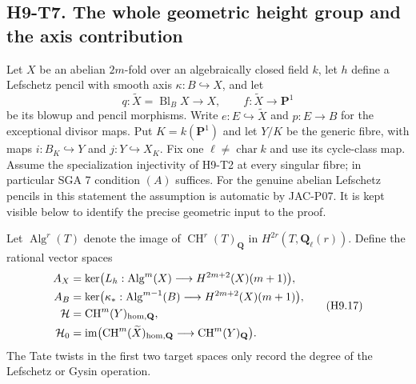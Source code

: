 
\subsection*{H9-T7. The whole geometric height group and the axis contribution}

Let $X$ be an abelian $2m$-fold over an algebraically closed field $k$,
let $h$ define a Lefschetz pencil with smooth axis
$\kappa:B\hookrightarrow X$, and let
\[
 q:\widetilde X=\operatorname{Bl}_B X\longrightarrow X,
 \qquad f:\widetilde X\longrightarrow\mathbf P^1
\]
be its blowup and pencil morphisms. Write $e:E\hookrightarrow\widetilde X$
and $p:E\to B$ for the exceptional divisor maps. Put $K=k(\mathbf P^1)$
and let $Y/K$ be the generic fibre, with maps
$i:B_K\hookrightarrow Y$ and $j:Y\hookrightarrow X_K$.
Fix one $\ell\ne\operatorname{char}k$ and use its cycle-class map.
Assume the specialization injectivity of H9-T2 at every singular fibre;
in particular SGA 7 condition $(A)$ suffices.
For the genuine abelian Lefschetz pencils in this statement the
assumption is automatic by JAC-P07. It is kept visible below to
identify the precise geometric input to the proof.

Let $\operatorname{Alg}^r(T)$ denote the image of $\operatorname{CH}^r(T)_{\mathbf Q}$
in $H^{2r}(T,\mathbf Q_\ell(r))$. Define the rational vector spaces
\[
 \begin{split}
 A_X&=\ker\bigl(L_h:\operatorname{Alg}^m(X)\longrightarrow H^{2m+2}(X)(m+1)\bigr),\\
 A_B&=\ker\bigl(\kappa_*:\operatorname{Alg}^{m-1}(B)
                       \longrightarrow H^{2m+2}(X)(m+1)\bigr),\\
 \mathcal H&=\operatorname{CH}^m(Y)_{\rm hom,\mathbf Q},\\
 \mathcal H_0&=\operatorname{im}\bigl(
       \operatorname{CH}^m(\widetilde X)_{\rm hom,\mathbf Q}
           \longrightarrow\operatorname{CH}^m(Y)_{\mathbf Q}\bigr).
 \end{split}                                                   \tag{H9.17}
\]
The Tate twists in the first two target spaces only record the degree of
the Lefschetz or Gysin operation.

